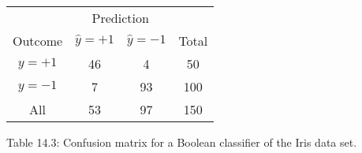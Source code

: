 \begin{table}
\begin{tabular}{c c c c} \hline \hline  & \multicolumn{2}{c}{Prediction} \\ \cline{2-5} Outcome & \(\hat{y}=+1\) & \(\hat{y}=-1\) & Total \\ \hline \(y=+1\) & 46 & 4 & 50 \\ \(y=-1\) & 7 & 93 & 100 \\ All & 53 & 97 & 150 \\ \hline \hline \end{tabular}
\end{table}
Table 14.3: Confusion matrix for a Boolean classifier of the Iris data set.

